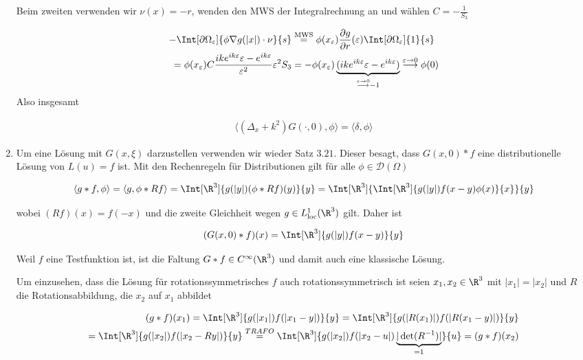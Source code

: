 \begin{solution}
\begin{enumerate}[label = (\roman*)]
Beim zweiten verwenden wir $\nu(x) = - r$, wenden den MWS der Integralrechnung an und wählen $C = -\frac{1}{S_3}$

\begin{align*}
  - \Int[\partial \Omega_\varepsilon]{\phi \nabla g(|x|) \cdot \nu}{s}
  &\stackrel{\text{MWS}}{=}
  \phi(x_\varepsilon) \frac{\partial g}{\partial r}(\varepsilon) \Int[\partial \Omega_\varepsilon]{1}{s} \\
  =
  \phi(x_\varepsilon) C \frac{ik e^{ik\varepsilon}\varepsilon - e^{ik\varepsilon}}{\varepsilon^2} \varepsilon^2 S_3
  &=
  -\phi(x_\varepsilon) \underbrace{(ik e^{ik\varepsilon}\varepsilon - e^{ik\varepsilon})}_{\stackrel{\varepsilon \to 0}{\longrightarrow} -1}
  \stackrel{\varepsilon \to 0}{\longrightarrow}
  \phi(0)
\end{align*}
Also insgesamt

\begin{align*}
  \langle (\Delta_x + k^2)G(\cdot, 0), \phi \rangle
  =
  \langle \delta, \phi \rangle
\end{align*}

\item Um eine Lösung mit $G(x,\xi)$ darzustellen verwenden wir wieder Satz $3.21$. Dieser besagt, dass
$G(x,0) \ast f$ eine distributionelle Lösung von $L(u) = f$ ist. Mit den Rechenregeln für Distributionen gilt für alle $\phi \in \mathcal{D}(\Omega)$

\begin{align*}
  \langle g \ast f, \phi \rangle
  =
  \langle g, \phi \ast Rf \rangle
  =
  \Int[\R^3]{g(|y|)(\phi \ast Rf)(y)}{y}
  =
  \Int[\R^3]{
    \Int[\R^3]{g(|y|) f(x-y) \phi(x)}{x}
    }{y}
\end{align*}

wobei $(Rf)(x) = f(-x)$ und die zweite Gleichheit wegen $g \in L^1_{\mathrm{loc}}(\R^3)$ gilt. Daher ist

\begin{align*}
  (G(x,0) \ast f)(x)
  =
  \Int[\R^3]{g(|y|) f(x-y)}{y}
\end{align*}

Weil $f$ eine Testfunktion ist, ist die Faltung $G \ast f \in C^{\infty}(\R^3)$ und damit auch eine klassische Lösung.

Um einzusehen, dass die Lösung für rotationssymmetrisches $f$ auch rotationssymmetrisch ist seien $x_1, x_2 \in \R^3$ mit
$|x_1| = |x_2|$ und $R$ die Rotationsabbildung, die $x_2$ auf $x_1$ abbildet

\begin{align*}
  (g \ast f)(x_1)
  =
  \Int[\R^3]{g(|x_1|) f(|x_1 - y|)}{y}
  = \Int[\R^3]{g(|R(x_1)|) f(|R(x_1 - y)|)}{y} \\
  =
  \Int[\R^3]{g(|x_2|) f(|x_2 - Ry|) }{y}
  \stackrel{TRAFO}{=} \Int[\R^3]{g(|x_2|) f(|x_2 - u|) \underbrace{|\det(R^{-1})|}_{=1}}{u} =
  (g \ast f)(x_2)
\end{align*}


\end{enumerate}
\end{solution}
